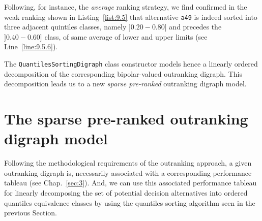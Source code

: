 Following, for instance, the \emph{average} ranking strategy, we find confirmed in the weak ranking shown in Listing~\vref{list:9.5}  that alternative \texttt{a49}  is indeed sorted into three adjacent quintiles classes, namely $]0.20-0.80]$ and precedes the $]0.40-0.60]$ class, of same average of lower and upper limits (see Line~\ref{line:9.5.6}).

The \texttt{QuantilesSortingDigraph} class constructor models hence a linearly ordered decomposition of the corresponding bipolar-valued outranking digraph. This decomposition leads us to a new \emph{sparse pre-ranked} outranking digraph model.

\section{The sparse pre-ranked outranking digraph model}
\label{sec:9.3}

Following the methodological requirements of the outranking approach, a given outranking digraph is, necessarily associated with a corresponding performance tableau (see Chap.~\ref{sec:3}). And, we can use this associated performance tableau for linearly decomposing the set of potential decision alternatives into ordered quantiles equivalence classes by using the quantiles sorting algorithm seen in the previous Section. 

